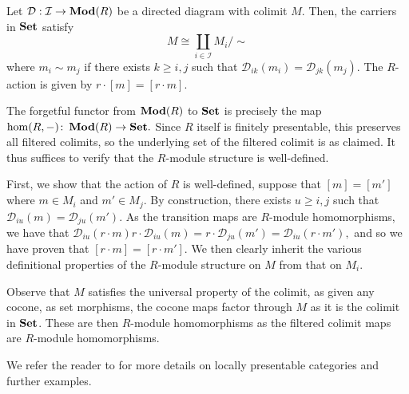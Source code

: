 \documentclass[runningheads]{llncs}
\begin{document}
 \begin{propositionE}
\label{prop:AbFC}
Let $\mathcal D: \mathcal I \to \operatorname{\mathbf{Mod}}(R)$ be a directed diagram with colimit $M$. Then, the carriers in $\mathbf{Set}$ satisfy
\begin{equation*}
M \cong \coprod_{i\in \mathcal I} M_i / \sim
\end{equation*}
where $m_i \sim m_j$ if there exists $k\geq i,j$ such that $\mathcal D_{ik}(m_i) = \mathcal D_{jk}(m_j).$ The $R$-action  is given by $r\cdot [m] = [r\cdot m].$
\end{propositionE} 
\begin{proofE}
The forgetful functor from $\operatorname{\mathbf{Mod}}(R)$ to $\mathbf{Set}$ is precisely the map $\hom(R,-)\colon \operatorname{\mathbf{Mod}}(R) \to \mathbf{Set}.$ Since $R$ itself is finitely presentable, this preserves all filtered colimits, so the underlying set of the filtered colimit is as claimed. It thus suffices to verify that the $R$-module structure is well-defined.

First, we show that the action of $R$ is well-defined, suppose that  $[m] = [m']$ where $m \in M_i$ and $m'\in M_j$. By construction, there exists $u \geq i, j$ such that $\mathcal D_{iu}(m) = \mathcal D_{ju}(m')$. As the transition maps are $R$-module homomorphisms, we have that $\mathcal D_{iu}(r \cdot m)  r \cdot \mathcal D_{iu}(m) = r\cdot  \mathcal D_{ju}(m') = \mathcal D_{iu}(r \cdot m'),$ and so we have proven that $[r\cdot m] = [r\cdot m'].$  We then clearly inherit the various definitional properties of the $R$-module structure on $M$ from that on $M_i$. 
 
Observe that $M$ satisfies the universal property of the colimit, as given any cocone, as set morphisms, the cocone maps factor through $M$ as it is the colimit in $\mathbf{Set}$. These are then $R$-module homomorphisms as the filtered colimit maps are $R$-module homomorphisms.
\end{proofE}
 
 We refer the reader to \cite{ademek94} for more details on locally presentable categories and further examples.
\end{document}
